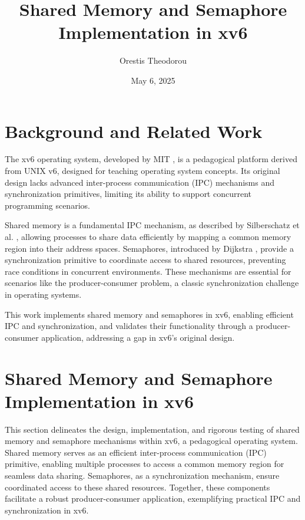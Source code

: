 \documentclass[12pt]{article}
\begin{document}
\title{Shared Memory and Semaphore Implementation in xv6}
\author{Orestis Theodorou}
\date{May 6, 2025}
\maketitle

\tableofcontents
\newpage

\section{Background and Related Work}
\label{sec:background}

The xv6 operating system, developed by MIT \cite{xv6}, is a pedagogical platform derived from UNIX v6, designed for teaching operating system concepts. Its original design lacks advanced inter-process communication (IPC) mechanisms and synchronization primitives, limiting its ability to support concurrent programming scenarios.

Shared memory is a fundamental IPC mechanism, as described by Silberschatz et al. \cite{silberschatz2018operating}, allowing processes to share data efficiently by mapping a common memory region into their address spaces. Semaphores, introduced by Dijkstra \cite{dijkstra1965cooperating}, provide a synchronization primitive to coordinate access to shared resources, preventing race conditions in concurrent environments. These mechanisms are essential for scenarios like the producer-consumer problem, a classic synchronization challenge in operating systems.

This work implements shared memory and semaphores in xv6, enabling efficient IPC and synchronization, and validates their functionality through a producer-consumer application, addressing a gap in xv6’s original design.

\section{Shared Memory and Semaphore Implementation in xv6}
\label{sec:implementation}

This section delineates the design, implementation, and rigorous testing of shared memory and semaphore mechanisms within xv6, a pedagogical operating system. Shared memory serves as an efficient inter-process communication (IPC) primitive, enabling multiple processes to access a common memory region for seamless data sharing. Semaphores, as a synchronization mechanism, ensure coordinated access to these shared resources. Together, these components facilitate a robust producer-consumer application, exemplifying practical IPC and synchronization in xv6.
\end{document}
